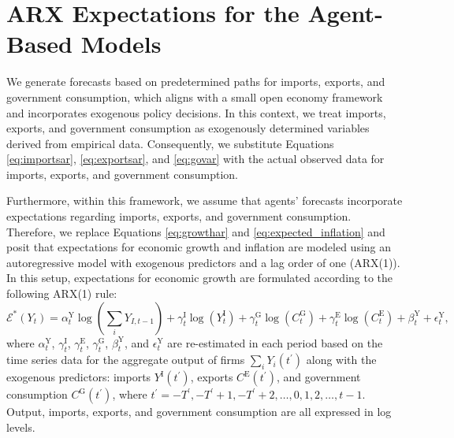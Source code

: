 \section{ARX Expectations for the Agent-Based Models} \label{sec:abmconditional}
We generate forecasts based on predetermined paths for imports, exports, and government consumption, which aligns with a small open economy framework and incorporates exogenous policy decisions. In this context, we treat imports, exports, and government consumption as exogenously determined variables derived from empirical data. Consequently, we substitute Equations \eqref{eq:importsar}, \eqref{eq:exportsar}, and \eqref{eq:govar} with the actual observed data for imports, exports, and government consumption.

Furthermore, within this framework, we assume that agents' forecasts incorporate expectations regarding imports, exports, and government consumption. Therefore, we replace Equations \eqref{eq:growthar} and \eqref{eq:expected_inflation} and posit that expectations for economic growth and inflation are modeled using an autoregressive model with exogenous predictors and a lag order of one (ARX(1)). In this setup, expectations for economic growth are formulated according to the following ARX(1) rule: 
\begin{equation} \label{eq:growtharx}
	\mathcal{E}^*(Y_t) = \alpha^{\mathrm{Y}}_{t} \log \left(\sum_i Y_{I,t-1}\right) + \gamma^{\mathrm{I}}_{t}\log(Y^{\mathrm{I}}_{t}) + \gamma^{\mathrm{G}}_{t}\log(C^{\mathrm{G}}_{t}) + \gamma^{\mathrm{E}}_{t}\log(C^{\mathrm{E}}_{t}) + \beta^{\mathrm{Y}}_{t} + \epsilon^{\mathrm{Y}}_{t},
\end{equation}
where \(\alpha^{\mathrm{Y}}_{t}\), \(\gamma^{\mathrm{I}}_{t}\), \(\gamma^{\mathrm{E}}_{t}\), \(\gamma^{\mathrm{G}}_{t}\), \(\beta^{\mathrm{Y}}_{t}\), and \(\epsilon^{\mathrm{Y}}_{t}\) are re-estimated in each period based on the time series data for the aggregate output of firms \(\sum_i Y_{i}(t^{\prime})\) along with the exogenous predictors: imports \(Y^{\mathrm{I}}(t^{\prime})\), exports \(C^{\mathrm{E}}(t^{\prime})\), and government consumption \(C^{\mathrm{G}}(t^{\prime})\), where \(t^{\prime} = -T^{\prime}, -T^{\prime}+1, -T^{\prime}+2, \ldots, 0, 1, 2, \ldots, t-1\). Output, imports, exports, and government consumption are all expressed in log levels.

